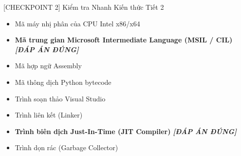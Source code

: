 \documentclass[aspectratio=169, 10pt]{beamer}
\begin{document}
\begin{frame}{[CHECKPOINT 2] Kiểm tra Nhanh Kiến thức Tiết 2}
  \begin{tcolorbox}[colback=UniOrange!5,colframe=UniOrange,top=1.5mm,bottom=1.5mm,title=\textbf{Câu hỏi 1: Mã nguồn C\# khi biên dịch lần đầu sẽ tạo ra loại mã nào?}]
    \begin{itemize}\scriptsize
      \item[A.] Mã máy nhị phân của CPU Intel x86/x64
      \item[B.] \textbf{Mã trung gian Microsoft Intermediate Language (MSIL / CIL)} \hfill \textit{\color{UniGreen}\textbf{[ĐÁP ÁN ĐÚNG]}}
      \item[C.] Mã hợp ngữ Assembly
      \item[D.] Mã thông dịch Python bytecode
    \end{itemize}
  \end{tcolorbox}
  \vskip 1mm
  \begin{tcolorbox}[colback=CSharpPurple!5,colframe=CSharpPurple,top=1.5mm,bottom=1.5mm,title=\textbf{Câu hỏi 2: Thành phần nào trong CLR dịch MSIL sang mã máy khi ứng dụng chạy?}]
    \begin{itemize}\scriptsize
      \item[A.] Trình soạn thảo Visual Studio
      \item[B.] Trình liên kết (Linker)
      \item[C.] \textbf{Trình biên dịch Just-In-Time (JIT Compiler)} \hfill \textit{\color{UniGreen}\textbf{[ĐÁP ÁN ĐÚNG]}}
      \item[D.] Trình dọn rác (Garbage Collector)
    \end{itemize}
  \end{tcolorbox}
\end{frame}
\end{document}

